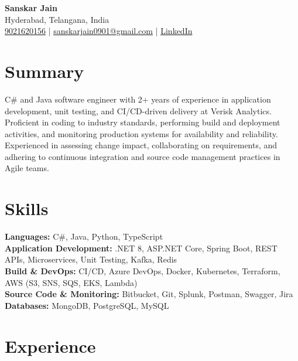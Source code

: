 \documentclass[letterpaper,10pt]{article}
\begin{document}
\begin{center}
    {\LARGE \textbf{Sanskar Jain}} \\
    Hyderabad, Telangana, India \\
    \href{tel:9021620156}{9021620156} \;|\;
    \href{mailto:sanskarjain0901@gmail.com}{sanskarjain0901@gmail.com} \;|\;
    \href{https://www.linkedin.com/in/sanskar-jain0901/}{LinkedIn}
\end{center}

\vspace{3pt}

\section*{Summary}
C\# and Java software engineer with 2+ years of experience in application development, unit testing, and CI/CD-driven delivery at Verisk Analytics.
Proficient in coding to industry standards, performing build and deployment activities, and monitoring production systems for availability and reliability.
Experienced in assessing change impact, collaborating on requirements, and adhering to continuous integration and source code management practices in Agile teams.

\section*{Skills}
\textbf{Languages:} C\#, Java, Python, TypeScript \\
\textbf{Application Development:} .NET 8, ASP.NET Core, Spring Boot, REST APIs, Microservices, Unit Testing, Kafka, Redis \\
\textbf{Build \& DevOps:} CI/CD, Azure DevOps, Docker, Kubernetes, Terraform, AWS (S3, SNS, SQS, EKS, Lambda) \\
\textbf{Source Code \& Monitoring:} Bitbucket, Git, Splunk, Postman, Swagger, Jira \\
\textbf{Databases:} MongoDB, PostgreSQL, MySQL

\section*{Experience}
\end{document}
